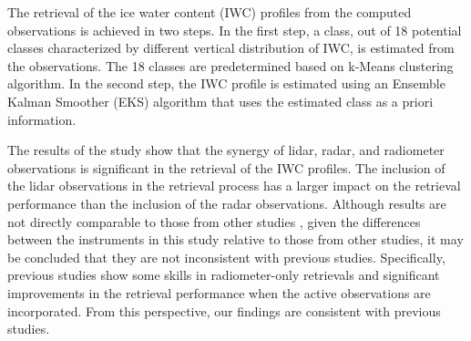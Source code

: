 \documentclass{ametsocV6.1}
\begin{document}
The retrieval of the ice water content (IWC) profiles from the computed observations is achieved in two steps.  In the first step, a class, out of 18 potential classes characterized by different  vertical distribution of IWC, is estimated from the observations. The 18 classes are predetermined based on k-Means clustering algorithm.  In the second step, the IWC profile is estimated using an Ensemble Kalman Smoother (EKS) algorithm that uses the estimated class as a priori information.

The results of the study show that the synergy of lidar, radar, and radiometer observations is significant in the retrieval of the IWC profiles.  The inclusion of the lidar observations in the retrieval process has a larger impact on the retrieval performance than the inclusion of the radar observations.  Although results are not directly comparable to those from other studies \citep{pfreundschuh2020synergistic,liu2022assessing}, given the differences between the instruments in this study relative to those from other studies, it may be concluded that they are not inconsistent with previous studies. Specifically, previous studies show some skills in radiometer-only retrievals and significant improvements in the retrieval performance when the active observations are incorporated. From this perspective, our findings are consistent with previous studies.
\end{document}
